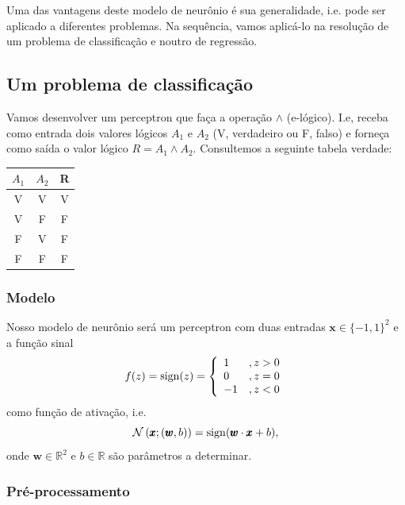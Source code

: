 Uma das vantagens deste modelo de neurônio é sua generalidade, i.e. pode ser aplicado a diferentes problemas. Na sequência, vamos aplicá-lo na resolução de um problema de classificação e noutro de regressão.


\subsection{Um problema de classificação}

Vamos desenvolver um perceptron que faça a operação $\land$ (e-lógico). I.e, receba como entrada dois valores lógicos $A_1$ e $A_2$ (V, verdadeiro ou F, falso) e forneça como saída o valor lógico $R = A_1 \land A_2$. Consultemos a seguinte tabela verdade:

\begin{center}
  \begin{tabular}{cc|c}
    $A_1$ & $A_2$ & R\\\hline
    V & V & V\\
    V & F & F\\
    F & V & F\\
    F & F & F\\\hline
  \end{tabular}
\end{center}


\subsubsection{Modelo}

Nosso modelo de neurônio será um perceptron com duas entradas $\pmb{x}\in \{-1,1\}^2$ e a função sinal
\begin{equation}
  f(z) = \operatorname{sign}(z) = \left\{
    \begin{array}{ll}
      1 &, z>0\\
      0 &, z=0\\
      -1 &, z<0
    \end{array}
\right.
\end{equation}
como função de ativação, i.e.
\begin{equation}
  \mathcal{N}\left(\pmb{x};(\pmb{w},b)\right) = \operatorname{sign}(\pmb{w}\cdot\pmb{x} + b),
\end{equation}
onde $\pmb{w}\in\mathbb{R}^2$ e $b\in\mathbb{R}$ são parâmetros a determinar.


\subsubsection{Pré-processamento}

